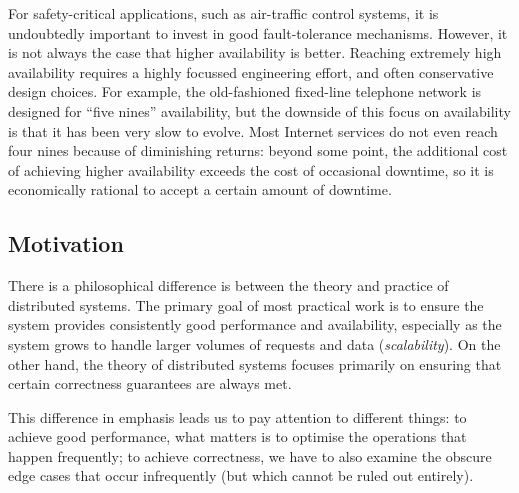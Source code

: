 
For safety-critical applications, such as air-traffic control systems, it is undoubtedly important to invest in good fault-tolerance mechanisms.
However, it is not always the case that higher availability is better.
Reaching extremely high availability requires a highly focussed engineering effort, and often conservative design choices.
For example, the old-fashioned fixed-line telephone network is designed for ``five nines'' availability, but the downside of this focus on availability is that it has been very slow to evolve.
Most Internet services do not even reach four nines because of diminishing returns: beyond some point, the additional cost of achieving higher availability exceeds the cost of occasional downtime, so it is economically rational to accept a certain amount of downtime.

\subsection{Motivation}

There is a philosophical difference is between the theory and practice of distributed systems.
The primary goal of most practical work is to ensure the system provides consistently good performance and availability, especially as the system grows to handle larger volumes of requests and data (\emph{scalability}).
On the other hand, the theory of distributed systems focuses primarily on ensuring that certain correctness guarantees are always met.

This difference in emphasis leads us to pay attention to different things: to achieve good performance, what matters is to optimise the operations that happen frequently; to achieve correctness, we have to also examine the obscure edge cases that occur infrequently (but which cannot be ruled out entirely).


